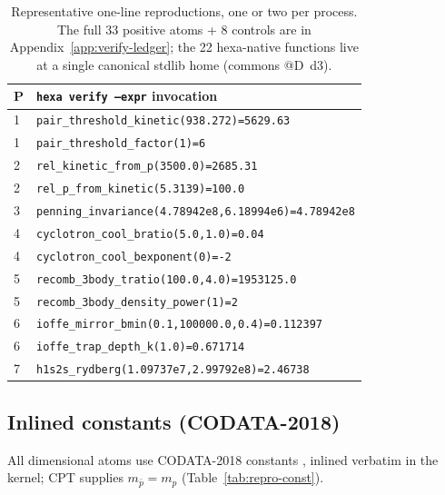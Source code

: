 \begin{table}[h]
\centering
\footnotesize
\setlength{\tabcolsep}{4pt}
\begin{tabular}{@{}c l@{}}
\toprule
\textbf{P} & \texttt{hexa verify --expr} invocation \\
\midrule
\textcircled{\scriptsize 1} & \verb|pair_threshold_kinetic(938.272)=5629.63| \\
\textcircled{\scriptsize 1} & \verb|pair_threshold_factor(1)=6| \\
\textcircled{\scriptsize 2} & \verb|rel_kinetic_from_p(3500.0)=2685.31| \\
\textcircled{\scriptsize 2} & \verb|rel_p_from_kinetic(5.3139)=100.0| \\
\textcircled{\scriptsize 3} & \verb|penning_invariance(4.78942e8,6.18994e6)=4.78942e8| \\
\textcircled{\scriptsize 4} & \verb|cyclotron_cool_bratio(5.0,1.0)=0.04| \\
\textcircled{\scriptsize 4} & \verb|cyclotron_cool_bexponent(0)=-2| \\
\textcircled{\scriptsize 5} & \verb|recomb_3body_tratio(100.0,4.0)=1953125.0| \\
\textcircled{\scriptsize 5} & \verb|recomb_3body_density_power(1)=2| \\
\textcircled{\scriptsize 6} & \verb|ioffe_mirror_bmin(0.1,100000.0,0.4)=0.112397| \\
\textcircled{\scriptsize 6} & \verb|ioffe_trap_depth_k(1.0)=0.671714| \\
\textcircled{\scriptsize 7} & \verb|h1s2s_rydberg(1.09737e7,2.99792e8)=2.46738| \\
\bottomrule
\end{tabular}
\caption{Representative one-line reproductions, one or two per process. The
full 33 positive atoms + 8 controls are in Appendix~\ref{app:verify-ledger};
the 22 hexa-native functions live at a single canonical stdlib home (commons
@D~d3).}
\label{tab:repro-cli}
\end{table}

\subsection{Inlined constants (CODATA-2018)}
\label{app:repro-const}

All dimensional atoms use CODATA-2018 constants \citep{mohr2018codata},
inlined verbatim in the kernel; CPT supplies $m_{\bar p}=m_p$
(Table~\ref{tab:repro-const}).

